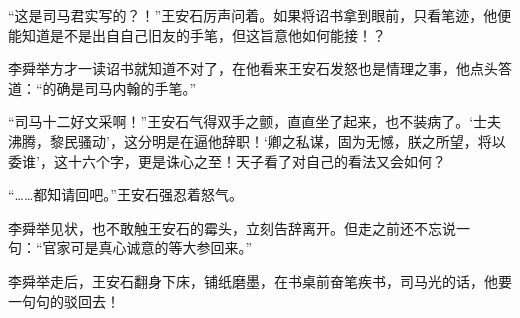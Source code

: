 “这是司马君实写的？！”王安石厉声问着。如果将诏书拿到眼前，只看笔迹，他便能知道是不是出自自己旧友的手笔，但这旨意他如何能接！？

李舜举方才一读诏书就知道不对了，在他看来王安石发怒也是情理之事，他点头答道：“的确是司马内翰的手笔。”

“司马十二好文采啊！”王安石气得双手之颤，直直坐了起来，也不装病了。‘士夫沸腾，黎民骚动’，这分明是在逼他辞职！‘卿之私谋，固为无憾，朕之所望，将以委谁’，这十六个字，更是诛心之至！天子看了对自己的看法又会如何？

“……都知请回吧。”王安石强忍着怒气。

李舜举见状，也不敢触王安石的霉头，立刻告辞离开。但走之前还不忘说一句：“官家可是真心诚意的等大参回来。”

李舜举走后，王安石翻身下床，铺纸磨墨，在书桌前奋笔疾书，司马光的话，他要一句句的驳回去！

